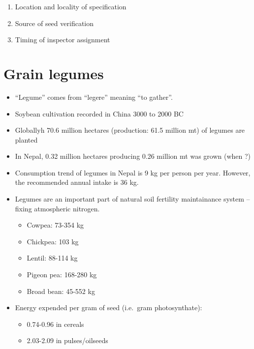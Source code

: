 \documentclass[
]{book}
\providecommand{\tightlist}{%
  \setlength{\itemsep}{0pt}\setlength{\parskip}{0pt}}
\begin{document}
\begin{itemize}
  \begin{enumerate}
  \def\labelenumi{\arabic{enumi}.}
  \setcounter{enumi}{1}
  \tightlist
  \item
    Location and locality of specification
  \item
    Source of seed verification
  \item
    Timing of inspector assignment
  \end{enumerate}
\end{itemize}

\hypertarget{grain-legumes}{%
\section{Grain legumes}\label{grain-legumes}}

\begin{itemize}
\tightlist
\item
  ``Legume'' comes from ``legere'' meaning ``to gather''.
\item
  Soybean cultivation recorded in China 3000 to 2000 BC
\item
  Globallyh 70.6 million hectares (production: 61.5 million mt) of legumes are planted
\item
  In Nepal, 0.32 million hectares producing 0.26 million mt was grown (when ?)
\item
  Consumption trend of legumes in Nepal is 9 kg per person per year. However, the recommended annual intake is 36 kg.
\item
  Legumes are an important part of natural soil fertility maintainance system -- fixing atmospheric nitrogen.

  \begin{itemize}
  \tightlist
  \item
    Cowpea: 73-354 kg
  \item
    Chickpea: 103 kg
  \item
    Lentil: 88-114 kg
  \item
    Pigeon pea: 168-280 kg
  \item
    Broad bean: 45-552 kg
  \end{itemize}
\item
  Energy expended per gram of seed (i.e.~gram photosynthate):

  \begin{itemize}
  \tightlist
  \item
    0.74-0.96 in cereals
  \item
    2.03-2.09 in pulses/oilseeds
  \end{itemize}
\end{itemize}
\end{document}
